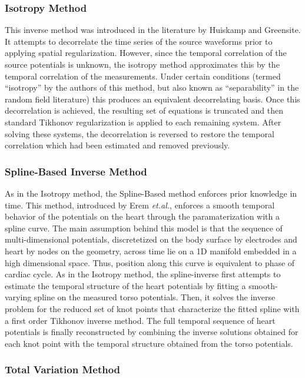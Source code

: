 \subsubsection{Isotropy Method}

This inverse method was introduced in the literature by Huiskamp and
Greensite.
It attempts to decorrelate the time series of the source waveforms prior to
applying spatial regularization.
However, since the temporal correlation of the source potentials
is unknown, the isotropy method approximates this by the temporal
correlation of the measurements. Under certain conditions (termed ``isotropy'' by the
authors of this method, but also known as ``separability'' in
the random field literature)
this produces an equivalent decorrelating basis. Once this decorrelation is
achieved, the resulting set of equations is truncated and then standard
Tikhonov regularization is applied to each remaining system. After solving
these systems, the decorrelation is reversed to restore the
temporal correlation which had been estimated and removed previously.

\subsubsection{Spline-Based Inverse Method}

As in the Isotropy method, the Spline-Based method enforces prior knowledge in time.
This method, introduced by Erem {\it et.al.}, enforces a smooth temporal behavior of the potentials on the heart through the paramaterization with a spline curve.
The main assumption behind this model is that the sequence of multi-dimensional potentials, discretetized on the body surface by electrodes and heart by nodes on the geometry, across time lie on a 1D manifold embedded in a high dimensional space.
Thus, position along this curve is equivalent to phase of cardiac cycle.
As in the Isotropy method, the spline-inverse first attempts to estimate the temporal structure of the heart potentials by fitting a smooth-varying spline on the measured torso potentials.
Then, it solves the inverse problem for the reduced set of knot points that characterize the fitted spline with a first order Tikhonov inverse method.
The full temporal sequence of heart potentials is finally reconstructed by combining the inverse solutions obtained for each knot point with the temporal structure obtained from the torso potentials.

\subsubsection{Total Variation Method} \label{sec:inv-tv}

